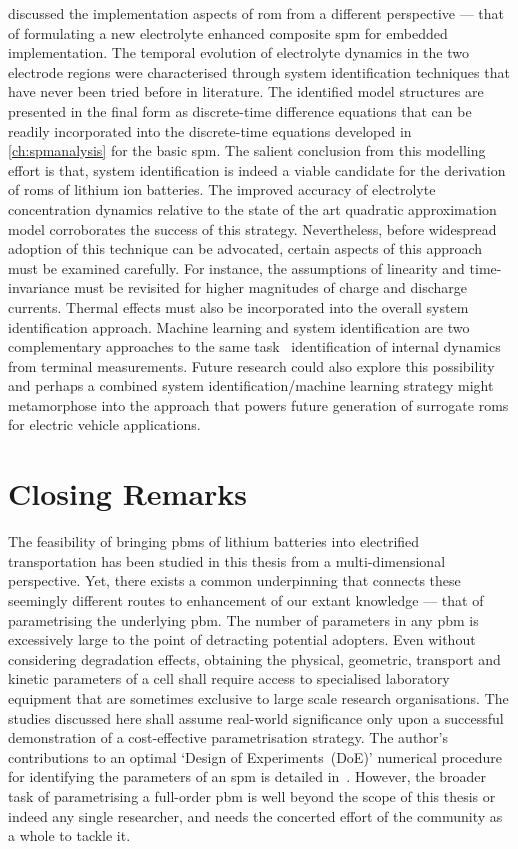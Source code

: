  discussed the implementation aspects of \gls{rom}
from a different perspective --- that of formulating a new electrolyte enhanced
composite \gls{spm} for embedded implementation. The temporal evolution of
electrolyte dynamics in the two electrode regions were characterised through
system identification techniques that have never been tried before in
literature. The identified model structures are presented in the final form as
discrete-time difference equations that can be readily incorporated into the
discrete-time equations developed in \cref{ch:spmanalysis} for the basic
\gls{spm}. The salient conclusion from this modelling effort is that, system
identification is indeed a viable candidate for the derivation of \glspl{rom} of
lithium ion batteries. The improved accuracy of electrolyte concentration
dynamics relative to the state of the art quadratic approximation model
corroborates the success of this strategy. Nevertheless, before widespread
adoption of this technique can be advocated, certain aspects of this approach
must be examined carefully. For instance, the assumptions of linearity and
time-invariance must be revisited for higher magnitudes of charge and discharge
currents. Thermal effects must also be incorporated into the overall system
identification approach. Machine learning and system identification are two
complementary approaches to the same task \ie~identification of internal
dynamics from terminal measurements. Future research could also explore this
possibility and perhaps a combined system identification/machine learning
strategy might metamorphose into the approach that powers future generation of
surrogate \glspl{rom} for electric vehicle applications.

\section{Closing Remarks}

The feasibility of bringing \glspl{pbm} of lithium batteries into electrified
transportation has been studied in this thesis from a multi-dimensional
perspective. Yet, there exists a common underpinning that connects these
seemingly different routes to enhancement of our extant knowledge --- that of
parametrising the underlying \gls{pbm}. The number of parameters in any
\gls{pbm} is excessively large to the point of detracting potential adopters.
Even without considering degradation effects, obtaining the physical, geometric,
transport and kinetic parameters of a cell shall require access to specialised
laboratory equipment that are sometimes exclusive to large scale research
organisations. The studies discussed here shall assume real-world significance
only upon a successful demonstration of a cost-effective parametrisation
strategy. The author's contributions to an optimal `Design of Experiments~(DoE)'
numerical procedure for identifying the parameters of an \gls{spm} is detailed
in~\cite{Pozzi2018}. However, the broader task of parametrising a
full-order \gls{pbm} is well beyond the scope of this thesis or indeed any
single researcher, and needs the concerted effort of the community as a whole to
tackle it.

